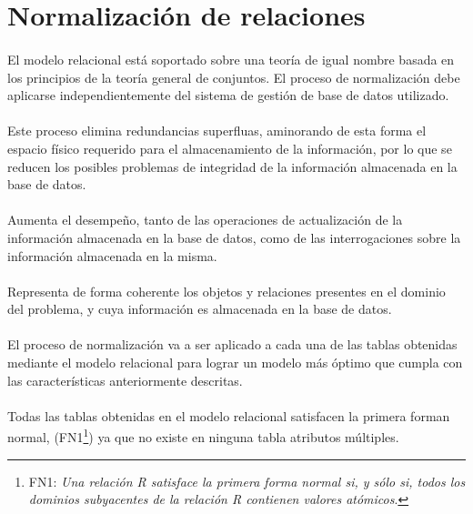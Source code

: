 \section{Normalización de relaciones}

  \paragraph{}El modelo relacional está soportado sobre una teoría de igual
  nombre basada en los principios de la teoría general de conjuntos. El
  proceso de normalización debe aplicarse independientemente del
  sistema de gestión de base de datos utilizado.

  \paragraph{}Este proceso elimina redundancias superfluas, aminorando de
  esta forma el espacio físico requerido para el almacenamiento de la
  información, por lo que se reducen los posibles problemas de
  integridad de la información almacenada en la base de datos.

  \paragraph{}Aumenta el desempeño, tanto de las operaciones de
  actualización de la información almacenada en la base de datos,
  como de las interrogaciones sobre la información almacenada en la
  misma.

  \paragraph{}Representa de forma coherente los objetos y relaciones
  presentes en el dominio del problema, y cuya información es
  almacenada en la base de datos.

  \paragraph{}El proceso de normalización va a ser aplicado a cada una de
  las tablas obtenidas mediante el modelo relacional para lograr un
  modelo más óptimo que cumpla con las características anteriormente
  descritas.

  \paragraph{}Todas las tablas obtenidas en el modelo relacional satisfacen
  la primera forman normal, (FN1\footnote{FN1: \textit{Una relación R satisface
  la primera forma normal si, y sólo si, todos los dominios subyacentes de la
  relación R contienen valores atómicos}.}) ya que no existe en ninguna tabla
  atributos múltiples.

